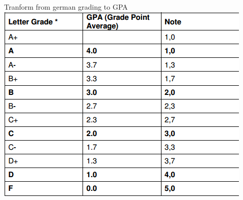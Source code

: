 \documentclass{resume} %
\begin{document}
\begin{CJK*}{UTF8}{gbsn}
% 
% 

\clearpage\end{CJK*}

\Large Tranform from german grading to GPA\\
\includegraphics{../Certificates/GermanyGradingToUSA-GPA.png}
\end{document}
